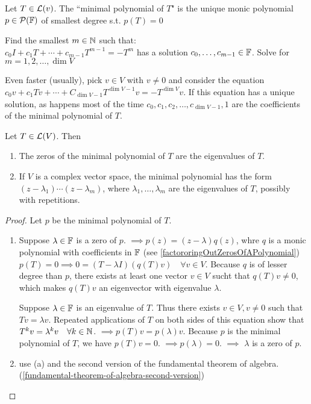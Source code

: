 \setcounter{thm}{23}

\begin{mydef}
    Let $T\in \mathcal{L} (v)$. The ``minimal polynomial of $T$" is the unique monic polynomial $p\in \mathcal{P}(\mathbb{F})$ of smallest degree s.t. $p(T)=0$
\end{mydef}
 Find the smallest $m \in \mathbb{N}$ such that: \\
$c_0I + c_1 T + \cdots + c_{m-1} T^{m-1} = -T^{m}$ has a solution $c_0, \dots, c_{m-1} \in \mathbb{F}$. Solve for $m=1,2,\dots,\dim V$

Even faster (usually), pick $v \in V$ with $v \neq 0$ and consider the equation $c_0v + c_1Tv + \cdots + C_{\dim V-1}T^{\dim V-1}v=-T^{\dim V}v$.
If this equation has a unique solution, as happens most of the time $c_0, c_1, c_2, \dots, c_{\dim V-1}, 1$ are the coefficients of the minimal polynomial of $T$.

\setcounter{thm}{26}
\begin{thm}
    \label{zeros-of-the-minimal-polynomial-of-T-are-the-eigenvalues-of-T}
    Let $T \in \mathcal{L}(V)$. Then
    \begin{enumerate}[label=(\alph*)]
        \item The zeros of the minimal polynomial of $T$ are the eigenvalues of $T$.
        \item If $V$ is a complex vector space, the minimal polynomial has the form $(z-\lambda_1)\cdots(z-\lambda_m)$, where $\lambda_1, \dots, \lambda_m$ are the eigenvalues of $T$, possibly with repetitions.
    \end{enumerate}
\end{thm}
\begin{proof} Let $p$ be the minimal polynomial of $T$.
    \begin{enumerate}[label=(\alph*)]
        \item Suppose $\lambda \in \mathbb{F}$ is a zero of $p$. $\implies p(z)=(z-\lambda)q(z)$, whre $q$ is a monic polynomial with coefficients in $\mathbb{F}$ (see \ref{factororingOutZerosOfAPolynomial}) \\
        $p(T)=0\implies 0=(T-\lambda I)(q(T)v) \quad \forall v\in V.$
        Because $q$ is of lesser degree than $p$, there exists at least one vector $v\in V$ sucht that $q(T)v \neq 0$, which makes $q(T)v$ an eigenvector with eigenvalue $\lambda$.

        Suppose $\lambda \in \mathbb{F}$ is an eigenvalue of $T$. Thus there exists $v\in V, v \neq 0$ such that $Tv=\lambda v$. Repeated applications of $T$ on both sides of this equation show that $T^kv =\lambda^k v \quad \forall k\in \mathbb{N}$.
        $\implies p(T)v=p(\lambda)v$. Because $p$ is the minimal polynomial of $T$, we have $p(T)v=0$. $\implies p(\lambda) = 0$. $\implies$ $\lambda$ is a zero of $p$.

        \item use (a) and the second version of the fundamental theorem of algebra. (\ref{fundamental-theorem-of-algebra-second-version})
     \end{enumerate}
\end{proof}

